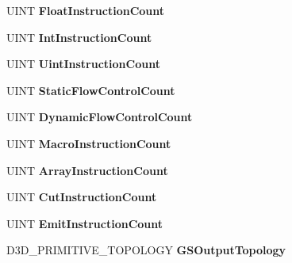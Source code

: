 \begin{DoxyCompactItemize}
U\+I\+NT {\bfseries Float\+Instruction\+Count}
\item 
\mbox{\label{struct___d3_d11___s_h_a_d_e_r___d_e_s_c_ae287e5cf9ec917a8acddad3b24daed06}} 
U\+I\+NT {\bfseries Int\+Instruction\+Count}
\item 
\mbox{\label{struct___d3_d11___s_h_a_d_e_r___d_e_s_c_a793e3b4e1912846fbc78cb85a160a42b}} 
U\+I\+NT {\bfseries Uint\+Instruction\+Count}
\item 
\mbox{\label{struct___d3_d11___s_h_a_d_e_r___d_e_s_c_a3cd6e784384fe4a48432c4baf4b1a5ae}} 
U\+I\+NT {\bfseries Static\+Flow\+Control\+Count}
\item 
\mbox{\label{struct___d3_d11___s_h_a_d_e_r___d_e_s_c_a833003635661235f5f2f36dbed7477d8}} 
U\+I\+NT {\bfseries Dynamic\+Flow\+Control\+Count}
\item 
\mbox{\label{struct___d3_d11___s_h_a_d_e_r___d_e_s_c_add306f4d9995ac709a47fbb60ba707fb}} 
U\+I\+NT {\bfseries Macro\+Instruction\+Count}
\item 
\mbox{\label{struct___d3_d11___s_h_a_d_e_r___d_e_s_c_afbb33dd7ce94f57922490049ab2ea440}} 
U\+I\+NT {\bfseries Array\+Instruction\+Count}
\item 
\mbox{\label{struct___d3_d11___s_h_a_d_e_r___d_e_s_c_a38238fb81888f1e416f92f54088695fc}} 
U\+I\+NT {\bfseries Cut\+Instruction\+Count}
\item 
\mbox{\label{struct___d3_d11___s_h_a_d_e_r___d_e_s_c_a85822d5efaca0b747b1de12a10d43f68}} 
U\+I\+NT {\bfseries Emit\+Instruction\+Count}
\item 
\mbox{\label{struct___d3_d11___s_h_a_d_e_r___d_e_s_c_a6a311c9c968274a12eac262588154b17}} 
D3\+D\+\_\+\+P\+R\+I\+M\+I\+T\+I\+V\+E\+\_\+\+T\+O\+P\+O\+L\+O\+GY {\bfseries G\+S\+Output\+Topology}
\item 
\mbox{\label{struct___d3_d11___s_h_a_d_e_r___d_e_s_c_a1cdd6a15e478f8dfcb3146e9c0630ca9}} 

\end{DoxyCompactItemize}
